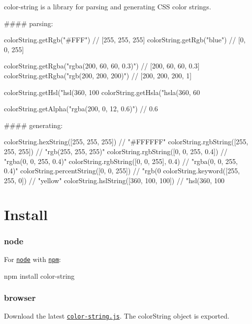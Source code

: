 color-\/string is a library for parsing and generating C\+SS color strings.

\#\#\#\# parsing\+: 
\begin{DoxyCode}
colorString.getRgb("#FFF")  // [255, 255, 255]
colorString.getRgb("blue")  // [0, 0, 255]

colorString.getRgba("rgba(200, 60, 60, 0.3)")    // [200, 60, 60, 0.3]
colorString.getRgba("rgb(200, 200, 200)")        // [200, 200, 200, 1]

colorString.getHsl("hsl(360, 100%
colorString.getHsla("hsla(360, 60%

colorString.getAlpha("rgba(200, 0, 12, 0.6)")    // 0.6
\end{DoxyCode}
 \#\#\#\# generating\+: 
\begin{DoxyCode}
colorString.hexString([255, 255, 255])   // "#FFFFFF"
colorString.rgbString([255, 255, 255])   // "rgb(255, 255, 255)"
colorString.rgbString([0, 0, 255, 0.4])  // "rgba(0, 0, 255, 0.4)"
colorString.rgbString([0, 0, 255], 0.4)  // "rgba(0, 0, 255, 0.4)"
colorString.percentString([0, 0, 255])   // "rgb(0%
colorString.keyword([255, 255, 0])       // "yellow"
colorString.hslString([360, 100, 100])   // "hsl(360, 100%
\end{DoxyCode}


\section*{Install}

\subsubsection*{node}

For \href{http://nodejs.org}{\tt node} with \href{http://npmjs.org}{\tt npm}\+: \begin{DoxyVerb}npm install color-string
\end{DoxyVerb}


\subsubsection*{browser}

Download the latest \href{https://github.com/harthur/color-string/tree/gh-pages}{\tt color-\/string.\+js}. The {\ttfamily color\+String} object is exported. 